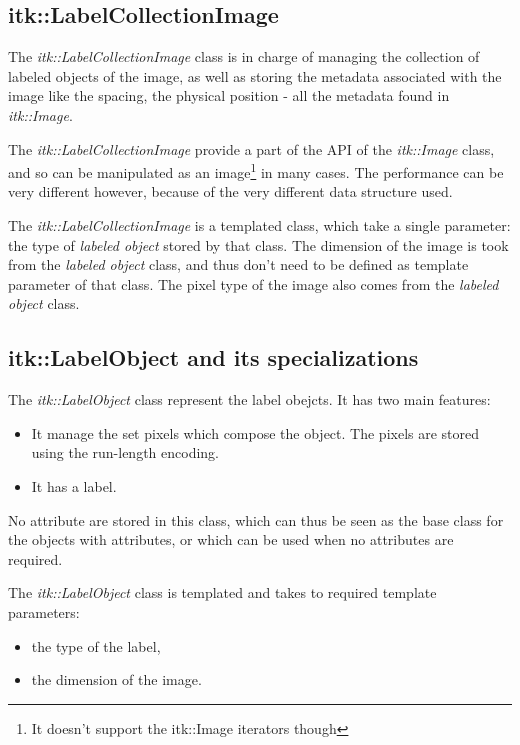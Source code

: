 \documentclass{InsightArticle}
\begin{document}
\subsection{itk::LabelCollectionImage}

The {\em itk::LabelCollectionImage} class is in charge of managing the
collection of labeled
objects of the image, as well as storing the metadata associated with the image
like
the spacing, the physical position - all the metadata found in {\em itk::Image}.

The {\em itk::LabelCollectionImage} provide a part of the API of the {\em
itk::Image} class, and so can be manipulated as an image\footnote{It doesn't
support the itk::Image iterators though} in many cases. The performance can be
very different however, because of the very different data structure used.

The {\em itk::LabelCollectionImage} is a templated class, which take a single
parameter: the type of {\em labeled object} stored by that class. The dimension
of the image is took from the {\em labeled object} class, and thus don't need to
be defined as template parameter of that class. The pixel type of the image
also comes from the {\em labeled object} class.

\subsection{itk::LabelObject and its specializations}

The {\em itk::LabelObject} class represent the label obejcts. It has two main
features:
\begin{itemize}
  \item It manage the set pixels which compose the object. The pixels are stored
using the run-length encoding.
  \item It has a label.
\end{itemize}

No attribute are stored in this class, which can thus be seen as the base class
for the objects with attributes, or which can be used when no attributes
are required.

The {\em itk::LabelObject} class is templated and takes to required template parameters:
\begin{itemize}
  \item the type of the label,
  \item the dimension of the image.
\end{itemize}
\end{document}
